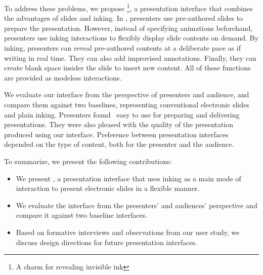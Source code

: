 To address these problems, we propose \interface \footnote{A charm for revealing invisible ink\cite{rowling1997harry}}, a presentation interface that combines the advantages of slides and inking.
%
In \interface, presenters use pre-authored slides to prepare the presentation. However, instead of specifying animations beforehand, presenters use inking interactions to flexibly display slide contents on demand. By inking, presenters can reveal pre-authored contents at a deliberate pace as if writing in real time. They can also add improvised annotations. Finally, they can create blank space insider the slide to insert new content. All of these functions are provided as modeless interactions.

We evaluate our interface from the perspective of presenters and audience, and compare them against two baselines, representing conventional electronic slides and plain inking. Presenters found \interface\ easy to use for preparing and delivering presentations. They were also pleased with the quality of the presentation produced using our interface. Preference between presentation interfaces depended on the type of content, both for the presenter and the audience.

To summarize, we present the following contributions: 
\begin{itemize}
  \item We present \interface, a presentation interface that uses inking as a main mode of interaction to present electronic slides in a flexible manner.
  \item We evaluate the interface from the presenters' and audiences' perspective and compare it against two baseline interfaces. 
  \item Based on formative interviews and observations from our user study, we discuss design directions for future presentation interfaces. 
\end{itemize}

